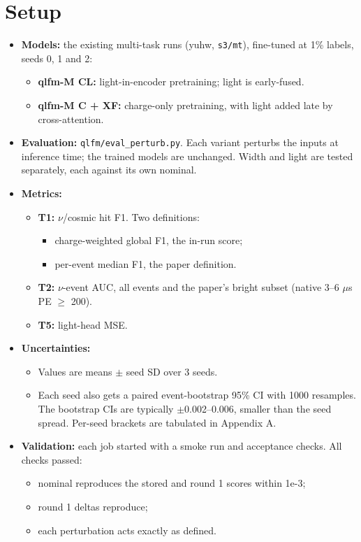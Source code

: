 \documentclass[10pt,a4paper]{article}
\begin{document}
\section{Setup}
\begin{itemize}
\item \textbf{Models:} the existing multi-task runs (yuhw, \texttt{s3/\allowbreak{}mt}), fine-tuned at 1\% labels, seeds 0, 1 and 2:
\begin{itemize}
\item \textbf{qlfm-M CL:} light-in-encoder pretraining; light is early-fused.
\item \textbf{qlfm-M C + XF:} charge-only pretraining, with light added late by cross-attention.
\end{itemize}
\item \textbf{Evaluation:} \texttt{qlfm/\allowbreak{}eval\_\allowbreak{}perturb.py}. Each variant perturbs the inputs at inference time; the trained models are unchanged. Width and light are tested separately, each against its own nominal.
\item \textbf{Metrics:}
\begin{itemize}
\item \textbf{T1:} $\nu$/cosmic hit F1. Two definitions:
\begin{itemize}
\item charge-weighted global F1, the in-run score;
\item per-event median F1, the paper definition.
\end{itemize}
\item \textbf{T2:} $\nu$-event AUC, all events and the paper's bright subset (native 3--6 $\mu$s PE $\geq$ 200).
\item \textbf{T5:} light-head MSE.
\end{itemize}
\item \textbf{Uncertainties:}
\begin{itemize}
\item Values are means $\pm$ seed SD over 3 seeds.
\item Each seed also gets a paired event-bootstrap 95\% CI with 1000 resamples. The bootstrap CIs are typically $\pm$0.002--0.006, smaller than the seed spread. Per-seed brackets are tabulated in Appendix A.
\end{itemize}
\item \textbf{Validation:} each job started with a smoke run and acceptance checks. All checks passed:
\begin{itemize}
\item nominal reproduces the stored and round 1 scores within 1e-3;
\item round 1 deltas reproduce;
\item each perturbation acts exactly as defined.
\end{itemize}
\end{itemize}
\end{document}
